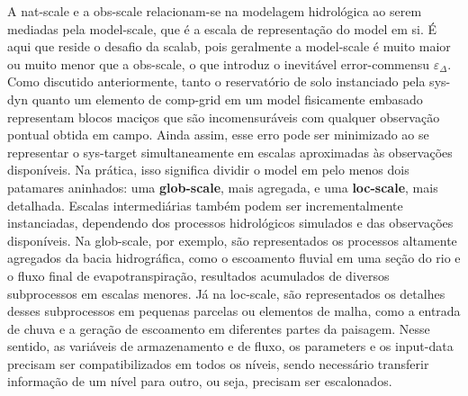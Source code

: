 \documentclass[./main.tex]{subfiles}
\begin{document}
\par A \gls{nat-scale} e a \gls{obs-scale} relacionam-se na modelagem hidrológica ao serem mediadas pela \gls{model-scale}, que é a escala de representação do \gls{model} em si. É aqui que reside o desafio da \gls{scalab}, pois geralmente a \gls{model-scale} é muito maior ou muito menor que a \gls{obs-scale}, o que introduz o inevitável \gls{error-commensu} $\varepsilon_{\Delta}$. Como discutido anteriormente, tanto o reservatório de solo instanciado pela \gls{sys-dyn} quanto um elemento de \gls{comp-grid} em um \gls{model} fisicamente embasado representam blocos maciços que são incomensuráveis com qualquer observação pontual obtida em campo. Ainda assim, esse erro pode ser minimizado ao se representar o \gls{sys-target} simultaneamente em escalas aproximadas às observações disponíveis. Na prática, isso significa dividir o \gls{model} em pelo menos dois patamares aninhados: uma \textbf{\gls{glob-scale}}, mais agregada, e uma\textbf{ \gls{loc-scale}}, mais detalhada. Escalas intermediárias também podem ser incrementalmente instanciadas, dependendo dos processos hidrológicos simulados e das observações disponíveis. Na \gls{glob-scale}, por exemplo, são representados os processos altamente agregados da bacia hidrográfica, como o escoamento fluvial em uma seção do rio e o fluxo final de evapotranspiração, resultados acumulados de diversos subprocessos em escalas menores. Já na \gls{loc-scale}, são representados os detalhes desses subprocessos em pequenas parcelas ou elementos de malha, como a entrada de chuva e a geração de escoamento em diferentes partes da paisagem. Nesse sentido, as variáveis de armazenamento e de fluxo, os \gls{parameters} e os \gls{input-data} precisam ser compatibilizados em todos os níveis, sendo necessário transferir informação de um nível para outro, ou seja, precisam ser escalonados. 
\end{document}
